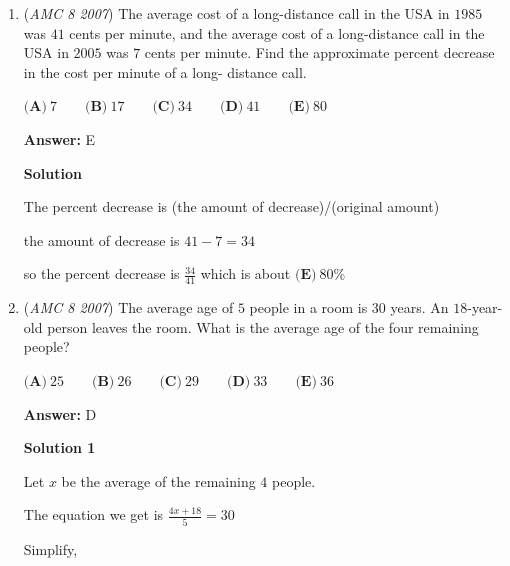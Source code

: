 \begin{enumerate}
 $\textbf{(A)}\ 24 \qquad\textbf{(B)}\ 25 \qquad\textbf{(C)}\ 26 \qquad\textbf{(D)}\ 27 \qquad\textbf{(E)}\ 28$

 \textbf{Answer: }B



\textbf{Solution}

Let $x$ be the number of weeks.

 Thus, we have the equation $50 + 35 + 15 + 16x = 500$.

 Simplify,

 $100 + 16x = 500$
$16x = 400$
$x = 25$

 The answer is $\boxed{\textbf{(B)}\ 25}$



	\item (\textit{AMC 8 2007}) The average cost of a long-distance call in the USA in $1985$ was
$41$ cents per minute, and the average cost of a long-distance
call in the USA in $2005$ was $7$ cents per minute. Find the
approximate percent decrease in the cost per minute of a long-
distance call.


 $\textbf{(A)}\ 7 \qquad\textbf{(B)}\ 17 \qquad\textbf{(C)}\ 34 \qquad\textbf{(D)}\ 41 \qquad\textbf{(E)}\ 80$

 \textbf{Answer: }E



\textbf{Solution}

The percent decrease is (the amount of decrease)/(original amount)

 the amount of decrease is $41 - 7 = 34$

 so the percent decrease is $\frac{34}{41}$ which is about $\boxed{\textbf{(E)}\ 80\%}$



	\item (\textit{AMC 8 2007}) The average age of $5$ people in a room is $30$ years. An $18$-year-old person leaves
the room. What is the average age of the four remaining people?


 $\textbf{(A)}\ 25 \qquad\textbf{(B)}\ 26 \qquad\textbf{(C)}\ 29 \qquad\textbf{(D)}\ 33 \qquad\textbf{(E)}\ 36$

 \textbf{Answer: }D



\textbf{Solution 1}

Let $x$ be the average of the remaining $4$ people.

 The equation we get is $\frac{4x + 18}{5} = 30$

 Simplify,


\end{enumerate}
